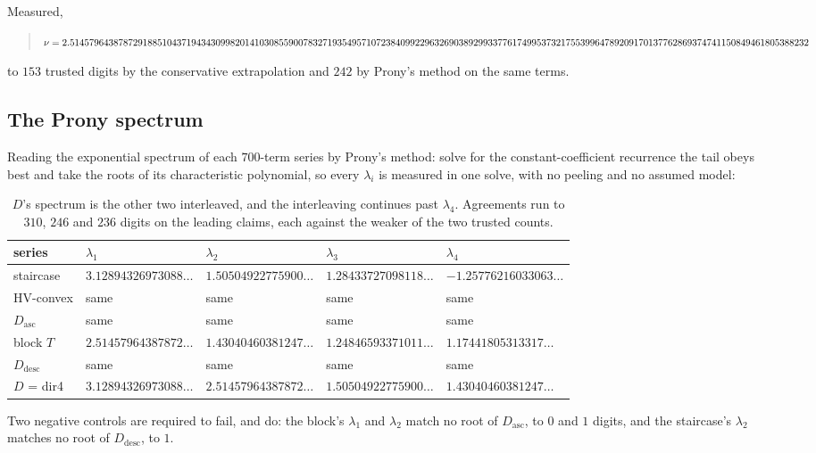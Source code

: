 \documentclass[11pt]{article}
\begin{document}
Measured,
\begin{quote}\small
$\nu = 2.5145796438787291885104371943430998201410308559007832719354957107238\\
4099229632690389299337761749953732175539964789209170137762869374741150849461805388232$
\end{quote}
to $153$ trusted digits by the conservative extrapolation and $242$ by Prony's
method on the same terms.

\subsection{The Prony spectrum}

Reading the exponential spectrum of each $700$-term series by Prony's method:
solve for the constant-coefficient recurrence the tail obeys best and take the
roots of its characteristic polynomial, so every $\lambda_i$ is measured in one
solve, with no peeling and no assumed model:

\begin{table}[H]
\centering\footnotesize\setlength{\tabcolsep}{4pt}
\begin{tabular}{l l l l l}
\toprule
series & $\lambda_1$ & $\lambda_2$ & $\lambda_3$ & $\lambda_4$ \\
\midrule
staircase & $3.12894326973088\dots$ & $1.50504922775900\dots$ & $1.28433727098118\dots$ & $-1.25776216033063\dots$ \\
HV-convex & same & same & same & same \\
$D_{\mathrm{asc}}$ & same & same & same & same \\
block $T$ & $2.51457964387872\dots$ & $1.43040460381247\dots$ & $1.24846593371011\dots$ & $1.17441805313317\dots$ \\
$D_{\mathrm{desc}}$ & same & same & same & same \\
$D$ = dir4 & $3.12894326973088\dots$ & $2.51457964387872\dots$ & $1.50504922775900\dots$ & $1.43040460381247\dots$ \\
\bottomrule
\end{tabular}
\caption{$D$'s spectrum is the other two interleaved, and the interleaving
continues past $\lambda_4$. Agreements run to $310$, $246$ and $236$ digits on
the leading claims, each against the weaker of the two trusted counts.}
\label{tab:prony}
\end{table}

Two negative controls are required to fail, and do: the block's $\lambda_1$ and
$\lambda_2$ match no root of $D_{\mathrm{asc}}$, to $0$ and $1$ digits, and the
staircase's $\lambda_2$ matches no root of $D_{\mathrm{desc}}$, to $1$.
\end{document}

